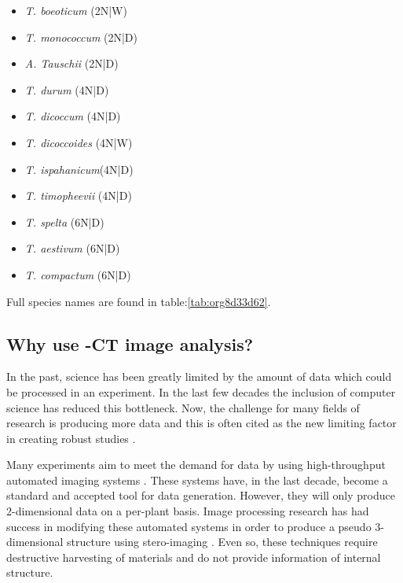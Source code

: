 \documentclass[11pt]{report}
\begin{document}
\begin{multicols}{3}

  \begin{itemize}
  \item{\textit{T. boeoticum} (2N|W)}
  \item{\textit{T. monococcum} (2N|D)}
  \item{\textit{A. Tauschii} (2N|D)}
  \end{itemize}

  \columnbreak

  \begin{itemize}
  \item{\textit{T. durum} (4N|D)}
  \item{\textit{T. dicoccum} (4N|D)}
  \item{\textit{T. dicoccoides} (4N|W)}
  \item{\textit{T. ispahanicum}(4N|D)}
  \item{\textit{T. timopheevii} (4N|D)}
  \end{itemize}

  \columnbreak

  \begin{itemize}
  \item{\textit{T. spelta} (6N|D)}
  \item{\textit{T. aestivum} (6N|D)}
  \item{\textit{T. compactum} (6N|D)}
  \end{itemize}

\end{multicols}
Full species names are found in table:\ref{tab:org8d33d62}.

\subsection{Why use \textmu{}-CT image analysis?}
\label{sec:org234bbd9}
In the past, science has been greatly limited by the amount of data which could be processed in an experiment. In the last few decades the inclusion of computer science has reduced this bottleneck. Now, the challenge for many fields of research is producing more data and this is often cited as the new limiting factor in creating robust studies \cite{Furbank2011}.

Many experiments aim to meet the demand for data by using high-throughput automated imaging systems \cite{Naumann2007,Prasanna2013,Humplik2015}. These systems have, in the last decade, become a standard and accepted tool for data generation. However, they will only produce 2-dimensional data on a per-plant basis. Image processing research has had success in modifying these automated systems in order to produce a pseudo 3-dimensional structure using stero-imaging \cite{Roussel2016}. Even so, these techniques require destructive harvesting of materials and do not provide information of internal structure.
\end{document}
